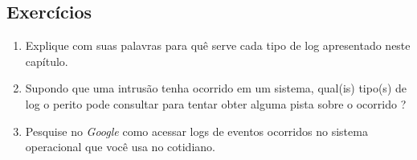     \subsection{Exercícios}

    \begin{example} \label{cap5_exercicios}
        \begin{enumerate}
            \item Explique com suas palavras para quê serve cada tipo de log apresentado neste capítulo.
            \item Supondo que uma intrusão tenha ocorrido em um sistema, qual(is) tipo(s) de log o perito pode consultar para tentar obter alguma pista sobre o ocorrido ?
            \item Pesquise no \textit{Google} como acessar logs de eventos ocorridos no sistema operacional que você usa no cotidiano.
        \end{enumerate}
    \end{example}
    
\newpage